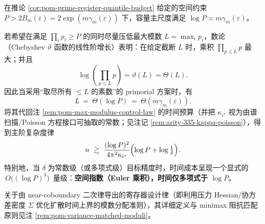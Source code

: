 \begin{remark}\label{rem:pom-primorial-polylog-time}
在推论 \ref{cor:pom-prime-register-quantile-budget} 给定的空间约束
\(
P>2B_m(\varepsilon)=2\exp(m\gamma_m(\varepsilon))
\)
下，容量主尺度满足 \(\log P\asymp m\gamma_m(\varepsilon)\)。
\par
若希望在满足 \(\prod_i p_i\ge P\) 的同时尽量压低最大模数 \(L=\max_i p_i\)，数论（Chebyshev \(\vartheta\) 函数的线性阶增长）表明：在给定截断 \(L\) 时，乘积 \(\prod_{p\le L}p\) 最大；并且
\[
\log\!\left(\prod_{p\le L}p\right)=\vartheta(L)=\Theta(L).
\]
因此当采用“取尽所有 \(\le L\) 的素数”的 primorial 方案时，有
\[
L\ =\ \Theta(\log P)\ =\ \Theta(m\gamma_m(\varepsilon)).
\]
将其代回注 \ref{rem:pom-max-modulus-control-law} 的时间预算（并把 \(\kappa_{i^\star}\) 视为由谱扫描/Poisson 方程接口可抽取的常数；见注记 \ref{rem:arity-335-kappa-poisson}），得到主阶复杂度律
\[
n\ \gtrsim\ \frac{(\log P)^2}{4\pi^2\kappa_{i^\star}}\Bigl(\log P+\log\tfrac{1}{\delta}\Bigr).
\]
特别地，当 \(\delta\) 为常数级（或多项式级）目标精度时，时间成本呈现一个显式的 \(\,O\big((\log P)^3\big)\,\) 量级：\textbf{空间指数（Euler 乘积），时间仅多项式于 \(\log P\)}。
\end{remark}

\begin{remark}[方差匹配的模数分配]
关于由 near-coboundary 二次律导出的寄存器设计律（即利用压力 Hessian/协方差密度 $\Sigma$ 优化扩散时间上界的模数分配准则），其详细定义与 minimax 阻抗匹配原则见注 \ref{rem:pom-variance-matched-moduli}。
\end{remark}

